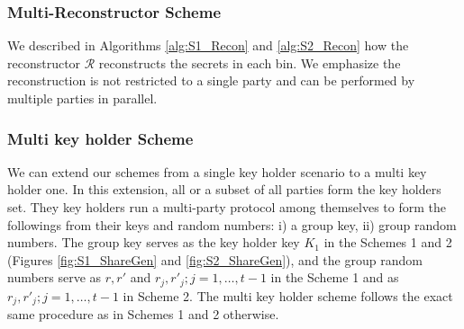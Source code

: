 \subsubsection{Multi-Reconstructor Scheme}
We described in Algorithms \ref{alg:S1_Recon} and \ref{alg:S2_Recon} how the reconstructor $\mathcal{R}$ reconstructs the secrets in each bin. We emphasize the reconstruction is not restricted to a single party and can be performed by multiple parties in parallel. 
\subsubsection{Multi key holder Scheme}
We can extend our schemes from a single key holder scenario to a multi key holder one. In this extension, all or a subset of all parties form the key holders set. They key holders run a multi-party protocol among themselves to form the followings from their keys and random numbers: i) a group key, ii) group random numbers. The group key serves as the key holder key $K_1$ in the Schemes 1 and 2 (Figures \ref{fig:S1_ShareGen} and \ref{fig:S2_ShareGen}), and the group random numbers serve as $r, r'$ and $r_j, r'_j; j=1,\dots,t-1$ in the Scheme 1 and as $r_j, r'_j; j=1,\dots,t-1$ in Scheme 2. The multi key holder scheme follows the exact same procedure as in Schemes 1 and 2 otherwise.
